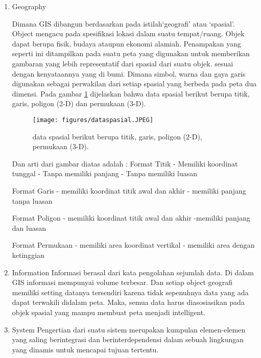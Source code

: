 \begin{enumerate}
\item Geography

Dimana GIS dibangun berdasarkan pada istilah‘geografi’ atau ‘spasial’.
Object mengacu pada spesifikasi lokasi dalam suatu tempat/ruang. Objek dapat berupa fisik,
budaya ataupun ekonomi alamiah. Penampakan yang seperti ini ditampilkan pada suatu peta yang 
digunakan untuk memberikan gambaran yang lebih representatif dari spasial dari suatu objek.
sesuai dengan kenyataannya yang di bumi. Dimana simbol, warna dan gaya garis digunakan sebagai
perwakilan dari setiap spasial yang berbeda pada peta dua dimensi.
Pada gambar \ref{dataspasial} dijelaskan bahwa data spasial berikut berupa 
titik, garis, poligon (2-D) dan permukaan (3-D).

\begin{figure}[ht]
	\centerline{\texttt{[image: figures/dataspasial.JPEG]}}
	\caption{data spasial berikut berupa titik, garis, poligon (2-D), permukaan (3-D).}
	\label{dataspasial}
	\end{figure}

Dan arti dari gambar diatas adalah :
Format Titik 						
- Memiliki koordinat tunggal 		
- Tanpa memiliki panjang 			
- Tanpa memiliki luasan

Format Garis
- memiliki koordinat titik awal dan akhir		
- memiliki panjang tanpa luasan

Format Poligon 					
- memiliki koordinat titik awal dan akhir
-memiliki panjang dan luasan 		

Format Permukaan
- memiliki area koordinat vertikal
- memiliki area dengan ketinggian

\item Information
Informasi berasal dari kata pengolahan sejumlah data. Di dalam GIS informasi mempunyai
volume terbesar. Dan setiap object geografi memiliki setting datanya tersendiri karena 
tidak sepenuhnya data yang ada dapat terwakili didalam peta. Maka, semua data harus
diasosiasikan pada objek spasial yang mampu membuat peta menjadi intelligent.

\item System
Pengertian dari suatu sistem merupakan kumpulan elemen-elemen yang saling berintegrasi 
dan berinterdependensi dalam sebuah lingkungan yang dinamis untuk mencapai tujuan tertentu.
\end{enumerate}

